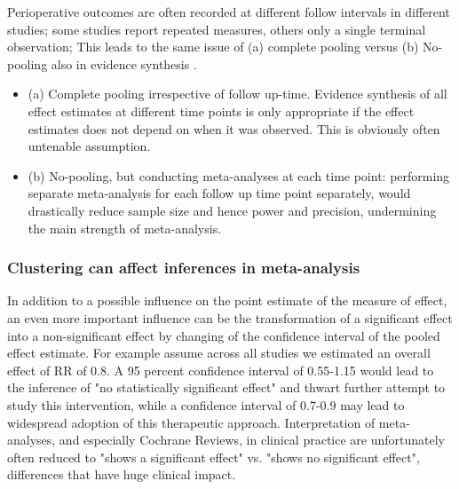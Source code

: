 \documentclass[11pt,notitlepage]{article}
\begin{document}
Perioperative outcomes are often recorded at different follow intervals in different studies; some studies report repeated measures, others only a single terminal observation; This leads to the same issue of (a) complete pooling versus (b) No-pooling also in evidence synthesis \cite{Roth2015CriticalCare}.

\begin{itemize}

\item (a) Complete pooling irrespective of follow up-time.
Evidence synthesis of all effect estimates at different time points is only appropriate if the effect estimates does not depend on when it was observed. This is obviously often untenable assumption.

\item (b) No-pooling, but conducting meta-analyses at each time point: performing separate meta-analysis for each follow up time point separately, would drastically reduce sample size and hence power and precision, undermining the main strength of meta-analysis.

\end{itemize}

\subsubsection*{Clustering can affect inferences in meta-analysis }

In addition to a possible influence on the point estimate of the measure of effect, an even more important influence can be the transformation of a significant effect into a non-significant effect by changing of the confidence interval of the pooled effect estimate. For example assume across all studies we estimated an overall effect of RR of 0.8. A 95 percent confidence interval of 0.55-1.15 would lead to the inference of "no statistically significant effect" and thwart further attempt to study this intervention, while a confidence interval of 0.7-0.9 may lead to widespread adoption of this therapeutic approach. Interpretation of meta-analyses, and especially Cochrane Reviews, in clinical practice are unfortunately often reduced to "shows a significant effect" vs. "shows no significant effect", differences that have huge clinical impact.
\end{document}
